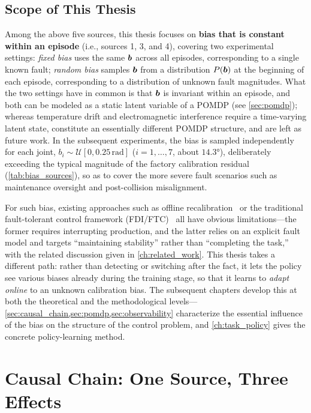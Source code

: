 \subsection*{Scope of This Thesis}

Among the above five sources, this thesis focuses on \textbf{bias that is constant within an episode} (i.e., sources 1, 3, and 4), covering two experimental settings: \emph{fixed bias} uses the same $\bm{b}$ across all episodes, corresponding to a single known fault; \emph{random bias} samples $\bm{b}$ from a distribution $P(\bm{b})$ at the beginning of each episode, corresponding to a distribution of unknown fault magnitudes. What the two settings have in common is that $\bm{b}$ is invariant within an episode, and both can be modeled as a static latent variable of a POMDP (see \cref{sec:pomdp}); whereas temperature drift and electromagnetic interference require a time-varying latent state, constitute an essentially different POMDP structure, and are left as future work. In the subsequent experiments, the bias is sampled independently for each joint, $b_i \sim \mathcal{U}[0, 0.25\,\text{rad}]$ ($i = 1, \dots, 7$, about $14.3°$), deliberately exceeding the typical magnitude of the factory calibration residual (\cref{tab:bias_sources}), so as to cover the more severe fault scenarios such as maintenance oversight and post-collision misalignment.

For such bias, existing approaches such as offline recalibration~\cite{kana2022fast,gong2000nongeometric} or the traditional fault-tolerant control framework (FDI/FTC)~\cite{blanke2016diagnosis} all have obvious limitations---the former requires interrupting production, and the latter relies on an explicit fault model and targets ``maintaining stability'' rather than ``completing the task,'' with the related discussion given in \cref{ch:related_work}. This thesis takes a different path: rather than detecting or switching after the fact, it lets the policy see various biases already during the training stage, so that it learns to \emph{adapt online} to an unknown calibration bias. The subsequent chapters develop this at both the theoretical and the methodological levels---\cref{sec:causal_chain,sec:pomdp,sec:observability} characterize the essential influence of the bias on the structure of the control problem, and \cref{ch:task_policy} gives the concrete policy-learning method.

\section{Causal Chain: One Source, Three Effects}\label{sec:causal_chain}

